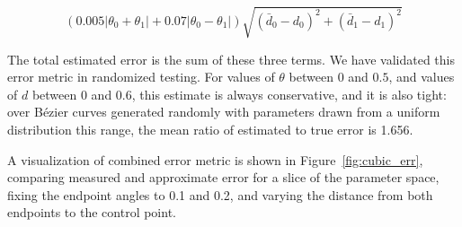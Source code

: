 \documentclass[sigconf, authordraft]{acmart}
\begin{document}
\[
    (0.005|\theta_0+\theta_1| + 0.07|\theta_0 - \theta_1|)\sqrt{(\bar{d}_0 - d_0)^2 + (\bar{d}_1 - d_1)^2}
\]

The total estimated error is the sum of these three terms. We have validated this error metric in randomized testing. For values of $\theta$ between $0$ and $0.5$, and values of $d$ between $0$ and $0.6$, this estimate is always conservative, and it is also tight: over Bézier curves generated randomly with parameters drawn from a uniform distribution this range, the mean ratio of estimated to true error is 1.656.

A visualization of combined error metric is shown in Figure~\ref{fig:cubic_err}, comparing measured and approximate error for a slice of the parameter space, fixing the endpoint angles to 0.1 and 0.2, and varying the distance from both endpoints to the control point.
\end{document}
